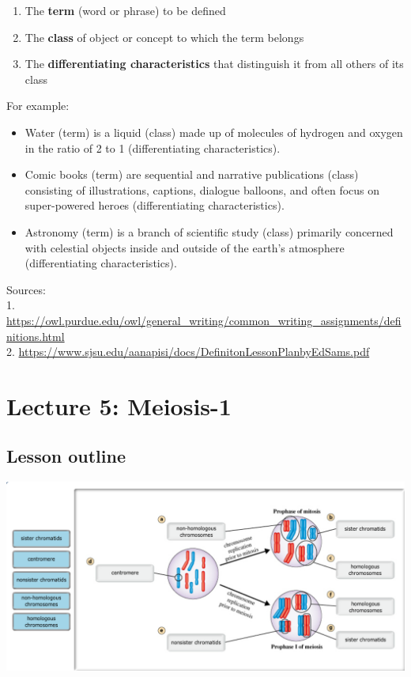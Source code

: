 \documentclass[
]{book}
\providecommand{\tightlist}{%
  \setlength{\itemsep}{0pt}\setlength{\parskip}{0pt}}
\begin{document}
\begin{enumerate}
\def\labelenumi{\arabic{enumi}.}
\tightlist
\item
  The \textbf{term} (word or phrase) to be defined\\
\item
  The \textbf{class} of object or concept to which the term belongs\\
\item
  The \textbf{differentiating characteristics} that distinguish it from all others of its class
\end{enumerate}

For example:

\begin{itemize}
\tightlist
\item
  Water (term) is a liquid (class) made up of molecules of hydrogen and oxygen in the ratio of 2 to 1 (differentiating characteristics).\\
\item
  Comic books (term) are sequential and narrative publications (class) consisting of illustrations, captions, dialogue balloons, and often focus on super-powered heroes (differentiating characteristics).\\
\item
  Astronomy (term) is a branch of scientific study (class) primarily concerned with celestial objects inside and outside of the earth's atmosphere (differentiating characteristics).
\end{itemize}

Sources:\\
1. \url{https://owl.purdue.edu/owl/general_writing/common_writing_assignments/definitions.html}\\
2. \url{https://www.sjsu.edu/aanapisi/docs/DefinitonLessonPlanbyEdSams.pdf}

\hypertarget{lecture-5-meiosis-1}{%
\section{Lecture 5: Meiosis-1}\label{lecture-5-meiosis-1}}

\hypertarget{lesson-outline-1}{%
\subsection{Lesson outline}\label{lesson-outline-1}}

\includegraphics{./img/nonsis.png}
\end{document}
